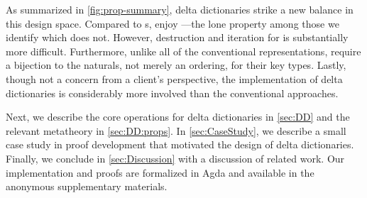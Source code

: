 As summarized in \autoref{fig:prop-summary}, delta dictionaries strike a new balance in this design space.
%
Compared to \cal{}s, \dds{} enjoy \SemTot{}---the lone property among those we identify which \cal{} does not.
%
However, destruction and iteration for \dds{} is substantially more difficult.
%
Furthermore, unlike all of the conventional representations, \dds{} require a bijection to the naturals, not merely an ordering, for their key types.
%
%
Lastly, though not a concern from a client's perspective, the implementation of delta dictionaries is considerably more involved than the conventional approaches.





%
Next, we describe the core operations for delta dictionaries in \autoref{sec:DD} and the relevant metatheory in \autoref{sec:DD:props}.
%
In \autoref{sec:CaseStudy}, we describe a small case study in proof development that motivated the design of delta dictionaries.
%
Finally, we conclude in \autoref{sec:Discussion} with a discussion of related work.
%
Our implementation and proofs are formalized in Agda and available in the anonymous supplementary materials.


